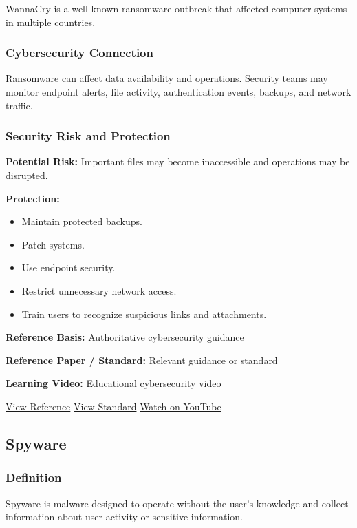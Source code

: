 \documentclass[12pt,a4paper]{article}
\newcommand{\refs}[3]{%
    \textbf{Reference Basis:} Authoritative cybersecurity guidance\par
    \textbf{Reference Paper / Standard:} Relevant guidance or standard\par
    \textbf{Learning Video:} Educational cybersecurity video\par
    \href{#1}{\textcolor{linkblue}{View Reference}}
    \quad
    \href{#2}{\textcolor{linkblue}{View Standard}}
    \quad
    \href{#3}{\textcolor{linkblue}{Watch on YouTube}}
}
\begin{document}
WannaCry is a well-known ransomware outbreak that affected computer systems in multiple countries.

\subsubsection{Cybersecurity Connection}

Ransomware can affect data availability and operations. Security teams may monitor endpoint alerts, file activity, authentication events, backups, and network traffic.

\subsubsection{Security Risk and Protection}

\textbf{Potential Risk:} Important files may become inaccessible and operations may be disrupted.

\textbf{Protection:}

\begin{itemize}
    \item Maintain protected backups.
    \item Patch systems.
    \item Use endpoint security.
    \item Restrict unnecessary network access.
    \item Train users to recognize suspicious links and attachments.
\end{itemize}

\refs
{https://www.cisa.gov/stopransomware}
{https://www.cisa.gov/stopransomware/ransomware-guide}
{https://www.youtube.com/results?search_query=Professor+Messer+ransomware}


\subsection{Spyware}

\subsubsection{Definition}

Spyware is malware designed to operate without the user's knowledge and collect information about user activity or sensitive information.
\end{document}
